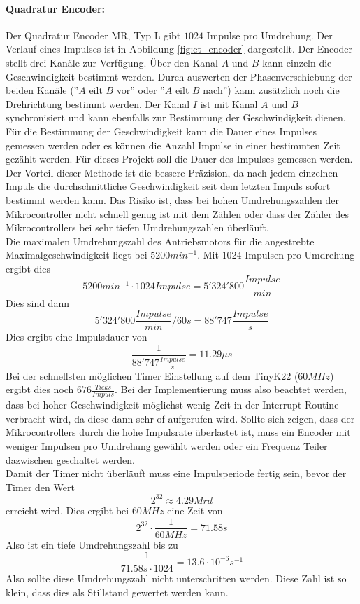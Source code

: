 \documentclass[../../main.tex]{subfiles}
\begin{document}
    \paragraph{Quadratur Encoder:} Der Quadratur Encoder MR, Typ L gibt $1024$ Impulse pro Umdrehung. Der Verlauf eines Impulses ist in Abbildung \ref{fig:et_encoder} dargestellt. Der Encoder stellt drei Kanäle zur Verfügung. Über den Kanal $A$ und $B$ kann einzeln die Geschwindigkeit bestimmt werden. Durch auswerten der Phasenverschiebung der beiden Kanäle (''$A$ eilt $B$ vor'' oder ''$A$ eilt $B$ nach'') kann zusätzlich noch die Drehrichtung bestimmt werden. Der Kanal $I$ ist mit Kanal $A$ und $B$ synchronisiert und kann ebenfalls zur Bestimmung der Geschwindigkeit dienen.\\
    Für die Bestimmung der Geschwindigkeit kann die Dauer eines Impulses gemessen werden oder es können die Anzahl Impulse in einer bestimmten Zeit gezählt werden. Für dieses Projekt soll die Dauer des Impulses gemessen werden. Der Vorteil dieser Methode ist die bessere Präzision, da nach jedem einzelnen Impuls die durchschnittliche Geschwindigkeit seit dem letzten Impuls sofort bestimmt werden kann. Das Risiko ist, dass bei hohen Umdrehungszahlen der Mikrocontroller nicht schnell genug ist mit dem Zählen oder dass der Zähler des Mikrocontrollers bei sehr tiefen Umdrehungszahlen überläuft.\\
    Die maximalen Umdrehungszahl des Antriebsmotors für die angestrebte Maximalgeschwindigkeit liegt bei $5200 min^{-1}$. Mit $1024$ Impulsen pro Umdrehung ergibt dies $$5200 min^{-1} \cdot 1024 Impulse = 5'324'800 \frac{Impulse}{min}$$
    Dies sind dann $$ 5'324'800 \frac{Impulse}{min} / 60s = 88'747 \frac{Impulse}{s} $$
    Dies ergibt eine Impulsdauer von $$\frac{1}{88'747 \frac{Impulse}{s}} = 11.29\mu s$$ Bei der schnellsten möglichen
    Timer Einstellung auf dem TinyK22 ($60MHz$) ergibt dies noch $676 \frac{Ticks}{Impuls}$. Bei der Implementierung
    muss also beachtet werden, dass bei hoher Geschwindigkeit möglichst wenig Zeit in der Interrupt Routine verbracht
    wird, da diese dann sehr of aufgerufen wird. Sollte sich zeigen, dass der Mikrocontrollers durch die hohe Impulsrate
    überlastet ist, muss ein Encoder mit weniger Impulsen pro Umdrehung gewählt werden oder ein Frequenz Teiler
    dazwischen geschaltet werden.\\
    Damit der Timer nicht überläuft muss eine Impulsperiode fertig sein, bevor der Timer den Wert $$2^{32} \approx 4.29 Mrd$$ erreicht wird. Dies ergibt bei $60MHz$ eine Zeit von $$2^{32} \cdot \frac{1}{60MHz} = 71.58s$$ Also ist ein tiefe Umdrehungszahl bis zu $$\frac{1}{71.58s \cdot 1024} = 13.6 \cdot 10^{-6} s^{-1}$$
    Also sollte diese Umdrehungszahl nicht unterschritten werden. Diese Zahl ist so klein, dass dies als Stillstand gewertet werden kann.
\end{document}
